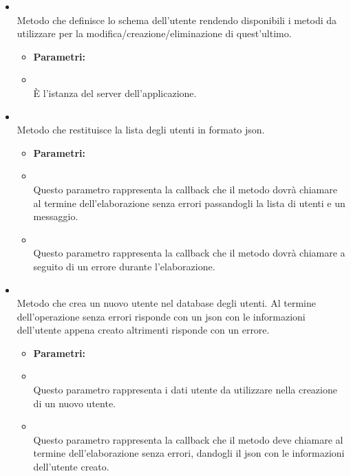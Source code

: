 \begin{itemize}
\item[] \textbf{} \\ Metodo che definisce lo schema  dell'utente rendendo disponibili i metodi da utilizzare per la modifica/creazione/eliminazione di quest'ultimo.
\begin{itemize}\addtolength{\itemsep}{-0.5\baselineskip}
\item[] \textbf{Parametri:}
\item[]  \\ È l'istanza del server dell'applicazione.
\end{itemize}
\item[] \textbf{} \\ Metodo che restituisce la lista degli utenti in formato json.
\begin{itemize}\addtolength{\itemsep}{-0.5\baselineskip}
\item[] \textbf{Parametri:}
\item[]  \\ Questo parametro rappresenta la callback che il metodo dovrà chiamare al termine dell'elaborazione senza errori passandogli la lista di utenti e un messaggio.
\item[]  \\ Questo parametro rappresenta la callback che il metodo dovrà chiamare a seguito di un errore durante l'elaborazione.
\end{itemize}
\item[] \textbf{} \\ Metodo che crea un nuovo utente nel database degli utenti. Al termine dell'operazione senza errori risponde con un json con le informazioni dell'utente appena creato altrimenti risponde con un errore. 
\begin{itemize}\addtolength{\itemsep}{-0.5\baselineskip}
\item[] \textbf{Parametri:}
\item[]  \\ Questo parametro rappresenta i dati utente da utilizzare nella creazione di un nuovo utente.
\item[]  \\ Questo parametro rappresenta la callback che il metodo deve chiamare al termine dell'elaborazione senza errori, dandogli il json con le informazioni dell'utente creato.

\end{itemize}
\end{itemize}
